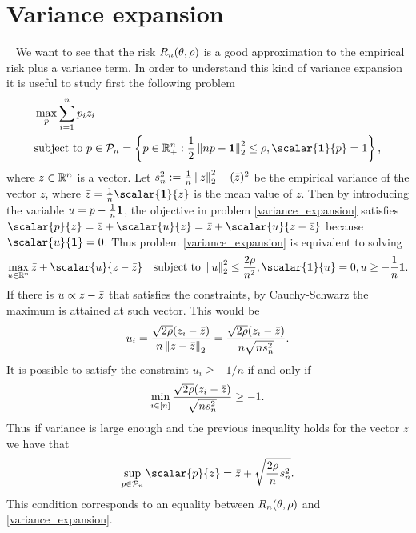 \section{Variance expansion}~\label{sec:var_expansion}
We want to see that the risk $R_n(\theta, \rho)$ is a good approximation to the empirical risk plus a variance term. In order to understand this kind of variance expansion it is useful to study first the following problem
\begin{align}\label{variance_expansion}
	\begin{aligned}
         &\max_{p} \sum_{i=1}^n p_i z_i \\
         &\text{subject to } p \in \Pn = \left\{p\in \R_+^n : \frac{1}{2} \enorm{np-\one}^2 \leq \rho, \scalar{\one}{p} = 1\right\},
	\end{aligned}
\end{align}
where $z \in \mathbb{R}^n$ is a vector. Let $s_n^2 := \frac{1}{n} \left\lVert z\right\rVert_2^2 - (\bar{z})^2 $ be the empirical variance of the vector $z$, where $\mean{z} = \frac{1}{n} \scalar{\one}{z}$ is the mean value of $z$. Then by introducing the variable $u=p-\frac{1}{n} \mathbf{1}$, the objective in problem \eqref{variance_expansion} satisfies $\scalar{p}{z} = \mean{z} + \scalar{u}{z} = \mean{z} + \scalar{u}{z-\mean{z}}$ because $\scalar{u}{\one}=0$. Thus problem \eqref{variance_expansion} is equivalent to solving
\[
    \max_{u \in \R^n} \mean{z} + \scalar{u}{z-\mean{z}} \quad \text{subject to } \enorm{u}^2 \leq \frac{2\rho}{n^2}, \scalar{\one}{u} = 0, u \geq -\frac{1}{n}\one.
\]
If there is $u \propto z-\bar{z}$ that satisfies the constraints, by Cauchy-Schwarz the maximum is attained at such vector. This would be
\[
    u_i = \frac{\sqrt{2\rho}(z_i -\bar{z})}{n\left\lVert z-\bar{z}\right\rVert_2} = \frac{\sqrt{2\rho} (z_i -\bar{z})}{n\sqrt{ns^2_n}}.
\]
It is possible to satisfy the constraint $u_i \geq -1/n$  if and only if
\[\label{eq:cond_u}
    \min_{i\in [n]} \frac{\sqrt{2\rho}(z_i - \bar{z})}{\sqrt{ns_n^2}} \geq -1.
\]
Thus if variance is large enough and the previous inequality holds for the vector $z$ we have that
\[
    \sup_{p\in\Pn} \scalar{p}{z} = \mean{z} + \sqrt{\frac{2\rho}{n} s_n^2}.
\]
This condition corresponds to an equality between $R_n(\theta, \rho)$ and \eqref{variance_expansion}.

